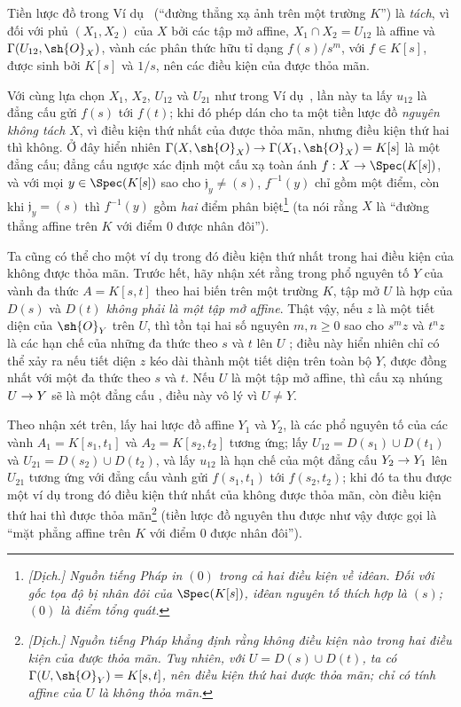 \documentclass[oneside]{amsart}
\makeatletter
\renewcommand{\geq}{\geqslant}
\newcommand{\ega@arrow}[2]{\mathchoice{#1}{#2}{#2}{#2}}
\renewcommand{\to}{\ega@arrow{\longrightarrow}{\rightarrow}}
\let\EGAOriginalLabel\label
\renewcommand{\label}[1]{\phantomsection\EGAOriginalLabel{#1}}
\makeatother
\begin{document}
\begin{examples}[5.5.11]
\label{I.5.5.11}
Tiền lược đồ trong Ví dụ~ (``đường thẳng xạ ảnh trên một trường
$K$'') là \emph{tách}, vì đối với phủ $(X_1,X_2)$ của $X$ bởi các tập mở
affine, $X_1\cap X_2=U_{12}$ là affine và
$\Gamma(U_{12},\sh{O}_X)$, vành các phân thức hữu tỉ dạng $f(s)/s^m$, với
$f\in K[s]$, được sinh bởi $K[s]$ và $1/s$, nên các điều kiện của
 được thỏa mãn.

Với cùng lựa chọn $X_1$, $X_2$, $U_{12}$ và $U_{21}$ như trong
Ví dụ~, lần này ta lấy $u_{12}$ là đẳng cấu gửi $f(s)$ tới
$f(t)$;
khi đó phép dán cho ta một tiền lược đồ \emph{nguyên không tách} $X$, vì điều
kiện thứ nhất của  được thỏa mãn, nhưng điều kiện thứ hai thì
không.
Ở đây hiển nhiên
$\Gamma(X,\sh{O}_X)\to\Gamma(X_1,\sh{O}_X)=K[s]$ là một đẳng cấu;
đẳng cấu ngược xác định một cấu xạ toàn ánh $f:X\to\Spec(K[s])$, và với mọi
$y\in\Spec(K[s])$ sao cho $\mathfrak{j}_y\neq(s)$, $f^{-1}(y)$ chỉ gồm một
điểm, còn khi $\mathfrak{j}_y=(s)$ thì $f^{-1}(y)$ gồm \emph{hai} điểm phân
biệt\footnote{\emph{[Dịch.] Nguồn tiếng Pháp in $(0)$ trong cả hai điều kiện
về iđêan. Đối với gốc tọa độ bị nhân đôi của $\Spec(K[s])$, iđêan nguyên tố
thích hợp là $(s)$; $(0)$ là điểm tổng quát.}} (ta nói rằng $X$ là ``đường
thẳng affine trên $K$ với điểm $0$ được nhân đôi'').

Ta cũng có thể cho một ví dụ trong đó điều kiện thứ nhất trong hai điều kiện
của  không được thỏa mãn.
Trước hết, hãy nhận xét rằng trong phổ nguyên tố $Y$ của vành đa thức
$A=K[s,t]$ theo hai biến trên một trường $K$, tập mở $U$ là hợp của $D(s)$ và
$D(t)$ \emph{không phải là một tập mở affine}.
Thật vậy, nếu $z$ là một tiết diện của $\sh{O}_Y$ trên $U$, thì tồn tại hai số
nguyên $m,n\geq0$ sao cho $s^mz$ và $t^nz$ là các hạn chế của những đa thức
theo $s$ và $t$ lên $U$ ; điều này hiển nhiên chỉ có thể xảy ra
nếu tiết diện $z$ kéo dài thành một tiết diện trên toàn bộ $Y$, được đồng nhất
với một đa thức theo $s$ và $t$.
Nếu $U$ là một tập mở affine, thì cấu xạ nhúng $U\to Y$ sẽ là một đẳng cấu
, điều này vô lý vì $U\neq Y$.

Theo nhận xét trên, lấy hai lược đồ affine $Y_1$ và $Y_2$, là các phổ nguyên
tố của các vành $A_1=K[s_1,t_1]$ và $A_2=K[s_2,t_2]$ tương ứng;
lấy $U_{12}=D(s_1)\cup D(t_1)$ và $U_{21}=D(s_2)\cup D(t_2)$, và lấy
$u_{12}$ là hạn chế của một đẳng cấu $Y_2\to Y_1$ lên $U_{21}$ tương ứng với
đẳng cấu vành gửi $f(s_1,t_1)$ tới $f(s_2,t_2)$;
khi đó ta thu được một ví dụ trong đó điều kiện thứ nhất của 
không được thỏa mãn, còn điều kiện thứ hai thì được thỏa
mãn\footnote{\emph{[Dịch.] Nguồn tiếng Pháp khẳng định rằng không điều kiện
nào trong hai điều kiện của  được thỏa mãn. Tuy nhiên, với
$U=D(s)\cup D(t)$, ta có $\Gamma(U,\sh{O}_Y)=K[s,t]$, nên điều kiện thứ hai
được thỏa mãn; chỉ có tính affine của $U$ là không thỏa mãn.}} (tiền lược đồ nguyên thu
được như vậy được gọi là ``mặt phẳng affine trên $K$ với điểm $0$ được nhân
đôi'').
\end{examples}
\end{document}
